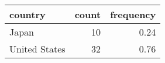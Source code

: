 \begin{table}[!h]
\centering
\begin{tabular}[t]{lrr}
\toprule
country & count & frequency\\
\midrule
Japan & 10 & 0.24\\
United States & 32 & 0.76\\
\bottomrule
\end{tabular}
\end{table}

